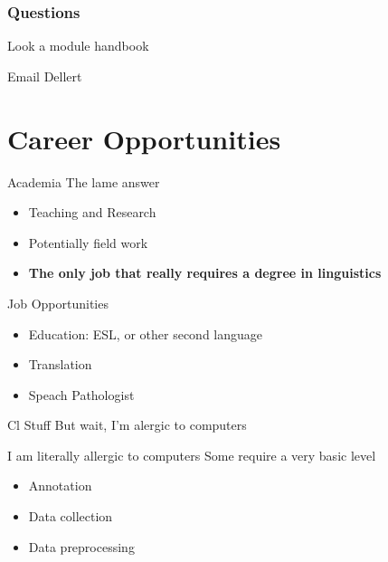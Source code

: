 \documentclass[aspectratio=169,hyperref={unicode}]{beamer}
\begin{document}
\begin{frame}[]
  \frametitle{Questions}
  \item Look a module handbook
  \item Email Dellert
\end{frame}
\section{Career Opportunities}


\begin{frame}{Academia}
The lame answer
  \begin{itemize}
    \item Teaching and Research
	\item Potentially field work 
    \item \textbf{The only job that really requires a degree in linguistics}

  \end{itemize}
\end{frame}

\begin{frame}{Job Opportunities}
  \begin{itemize}
    \item Education: ESL, or other second language
    \item Translation
    \item Speach Pathologist
  \end{itemize}
\end{frame}


\begin{frame}{Cl Stuff}
But wait, I'm alergic to computers
\end{frame}

\begin{frame}{I am literally allergic to computers}
Some require a very basic level
  \begin{itemize}
    \item Annotation
    \item Data collection
    \item Data preprocessing
  \end{itemize}


\end{frame}
\end{document}
